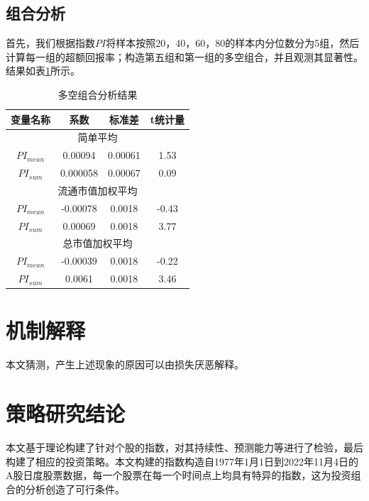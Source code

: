 \documentclass[a4paper,12pt]{report}
\begin{document}
\section{组合分析}
首先，我们根据指数$PI$将样本按照20，40，60，80的样本内分位数分为5组，然后计算每一组的超额回报率；构造第五组和第一组的多空组合，并且观测其显著性。结果如表\ref{portfolio analysis}所示。


\begin{table}[htbp]
	\caption{多空组合分析结果}
	\label{portfolio analysis}
	\centering
	\begin{tabular}{@{}cccc@{}}
		\toprule
		变量名称          & 系数    & 标准差   & t统计量  \\ \midrule
		\multicolumn{4}{c}{简单平均}         \\ \midrule
		$PI_{mean}$     & 0.00094  &0.00061 & 1.53  \\
		$PI_{sum}$      & 0.000058 &0.00067& 0.09  \\ \midrule
		\multicolumn{4}{c}{流通市值加权平均}     \\ \midrule
		$PI_{mean}$ & -0.00078  &0.0018& -0.43 \\
		$PI_{sum}$  & 0.00069   &0.0018& 3.77  \\ \midrule
		\multicolumn{4}{c}{总市值加权平均}      \\ \midrule
		$PI_{mean}$   & -0.00039  &0.0018& -0.22 \\
		$PI_{sum}$  & 0.0061  &0.0018& 3.46  \\ \bottomrule
	\end{tabular}
\end{table}

\chapter{机制解释}
本文猜测，产生上述现象的原因可以由损失厌恶解释。

\chapter{策略研究结论}
本文基于理论构建了针对个股的指数，对其持续性、预测能力等进行了检验，最后构建了相应的投资策略。本文构建的指数构造自1977年1月1日到2022年11月4日的A股日度股票数据，每一个股票在每一个时间点上均具有特异的指数，这为投资组合的分析创造了可行条件。

\nocite{*}
{\color{black} \printbibliography}
\end{document}
